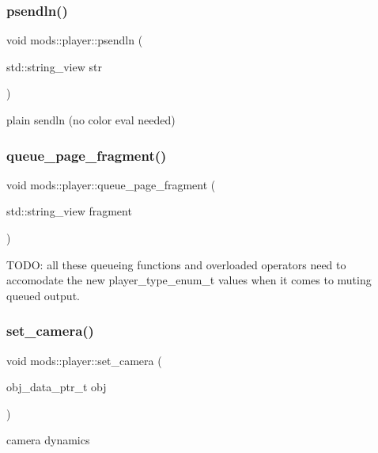\subsubsection{\texorpdfstring{psendln()}{psendln()}}
{\footnotesize\ttfamily void mods\+::player\+::psendln (\begin{DoxyParamCaption}\item[{std\+::string\+\_\+view}]{str }\end{DoxyParamCaption})}

\textquotesingle{}plain\textquotesingle{} sendln (no color eval needed) \mbox{\label{classmods_1_1player_a43832fcf34ddb3e7968a26703d3250cd}} 
\subsubsection{\texorpdfstring{queue\+\_\+page\+\_\+fragment()}{queue\_page\_fragment()}}
{\footnotesize\ttfamily void mods\+::player\+::queue\+\_\+page\+\_\+fragment (\begin{DoxyParamCaption}\item[{std\+::string\+\_\+view}]{fragment }\end{DoxyParamCaption})\hspace{0.3cm}{\ttfamily [inline]}}

T\+O\+DO\+: all these queueing functions and overloaded operators need to accomodate the new player\+\_\+type\+\_\+enum\+\_\+t values when it comes to muting queued output. \mbox{\label{classmods_1_1player_aec46cbc02ebe8769c4c831510acafce3}} 
\subsubsection{\texorpdfstring{set\+\_\+camera()}{set\_camera()}}
{\footnotesize\ttfamily void mods\+::player\+::set\+\_\+camera (\begin{DoxyParamCaption}\item[{obj\+\_\+data\+\_\+ptr\+\_\+t}]{obj }\end{DoxyParamCaption})}

camera dynamics \mbox{\label{classmods_1_1player_ad5c902bb8d73713f04628ca8988c128a}} 
